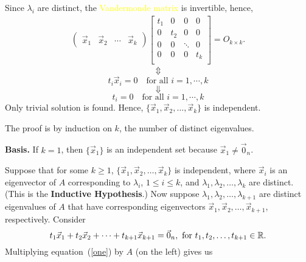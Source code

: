 \documentclass[pdf,9pt]{beamer}
\begin{document}
\begin{frame}[fragile]
   \begin{proofnoend}
       Since $\lambda_i$ are distinct, the \textcolor{yellow}{Vandermonde matrix} is invertible, hence,
	\begin{align*}
	\begin{pmatrix} \vec{x}_1 & \vec{x}_2 &\cdots & \vec{x}_k \end{pmatrix}
	    \begin{bmatrix}
		t_1 & 0   & 0      & 0   \\
		0   & t_2 & 0      & 0   \\
		0   & 0   & \ddots & 0   \\
		0   & 0   & 0      & t_k \\
	    \end{bmatrix}
	    = O_{k\times k}.
	\end{align*}
	\[\Updownarrow\]
	\[
	    t_i \vec{x}_i = 0 \quad \text{for all $i=1,\cdots, k$}
	\]
	\[\Downarrow\]
	\[t_i =0 \quad \text{for all $i=1,\cdots, k$} \]
	\bigskip
	Only trivial solution is found. Hence, $\{ \vec{x}_1, \vec{x}_2, \ldots, \vec{x}_k\}$ is independent.
	\myQED
   \end{proofnoend}
\end{frame}
\begin{frame}[fragile]
 \begin{proofnoend}
    The proof is by induction on $k$, the number of distinct eigenvalues.
    \smallskip

    {\bf Basis.} If $k=1$, then $\{\vec{x}_1\}$ is an independent set because
    $\vec{x}_1\neq \vec{0}_n$.

    Suppose that for some $k\geq 1$,
    $\{ \vec{x}_1, \vec{x}_2, \ldots, \vec{x}_k \}$
    is independent, where $\vec{x}_i$ is an
    eigenvector of $A$ corresponding to $\lambda_i$, $1\leq i\leq k$,
    and $\lambda_1, \lambda_2, \ldots, \lambda_k$ are distinct.
    \alert{(This is the {\bf Inductive Hypothesis}.)}
    \smallskip
    Now suppose $\lambda_1, \lambda_2, \ldots, \lambda_{k+1}$ are distinct
    eigenvalues of $A$ that have corresponding eigenvectors
    $\vec{x}_1, \vec{x}_2, \ldots, \vec{x}_{k+1}$, respectively.
    Consider
    \begin{equation}
        \label{one}
        t_1\vec{x}_1 + t_2\vec{x}_2 + \cdots + t_{k+1}\vec{x}_{k+1} =\vec{0}_n,
        \mbox{ for } t_1, t_2, \ldots , t_{k+1}\in\mathbb{R}.
    \end{equation}
    Multiplying equation~(\ref{one}) by $A$ (on the left) gives us
\end{proofnoend}
\end{frame}
\end{document}
